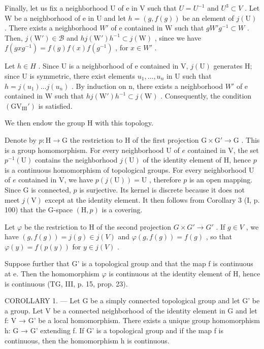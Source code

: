 Finally, let us fix a neighborhood U of e in V such that \(U = U^{-1}\) and \(U^{3} \subset V\) . Let W be a neighborhood of e in U and let \(h = (g, f(g))\) be an element of \(j(\mathrm{U})\) . There exists a neighborhood \(W'\) of e contained in W such that \(gW'g^{-1} \subset W\) . Then, \(j(\mathrm{W}') \in \mathcal{B}\) and \(hj(\mathrm{W}')h^{-1} \subset j(\mathrm{W})\) , since we have \(f(gxg^{-1}) = f(g)f(x)f(g^{-1})\) , for \(x \in W'\) .

Let \(h \in H\) . Since U is a neighborhood of e contained in V, \(j(\mathrm{U})\) generates H; since U is symmetric, there exist elements \(u_{1}, \ldots, u_{n}\) in U such that \(h = j(u_{1}) \ldots j(u_{n})\) . By induction on n, there exists a neighborhood \(W'\) of e contained in W such that \(hj(\mathrm{W}')h^{-1} \subset j(\mathrm{W})\) . Consequently, the condition \((\mathrm{GV}_{\mathrm{III}}')\) is satisfied.

We then endow the group H with this topology.

Denote by \(p \colon \mathrm{H} \to \mathrm{G}\) the restriction to H of the first projection \(\mathrm{G} \times \mathrm{G}' \to \mathrm{G}\) . This is a group homomorphism. For every neighborhood U of \(e\) contained in V, the set \(p^{-1}(\mathrm{U})\) contains the neighborhood \(j(\mathrm{U})\) of the identity element of H, hence \(p\) is a continuous homomorphism of topological groups. For every neighborhood U of \(e\) contained in V, we have \(p(j(\mathrm{U})) = \mathrm{U}\) , therefore \(p\) is an open mapping. Since G is connected, \(p\) is surjective. Its kernel is discrete because it does not meet \(j(\mathrm{V})\) except at the identity element. It then follows from Corollary 3 (I, p. 100) that the G-space \((\mathrm{H}, p)\) is a covering.

Let \(\varphi\) be the restriction to H of the second projection \(G \times G' \to G'\) . If \(g \in V\) , we have \((g, f(g)) = j(g) \in j(V)\) and \(\varphi(g, f(g)) = f(g)\) , so that \(\varphi(y) = f(p(y))\) for \(y \in j(V)\) .

Suppose further that G' is a topological group and that the map f is continuous at e. Then the homomorphism \(\varphi\) is continuous at the identity element of H, hence is continuous (TG, III, p. 15, prop. 23).

COROLLARY 1. --- Let G be a simply connected topological group and let G' be a group. Let V be a connected neighborhood of the identity element in G and let f: V → G' be a local homomorphism. There exists a unique group homomorphism h: G → G' extending f. If G' is a topological group and if the map f is continuous, then the homomorphism h is continuous.


